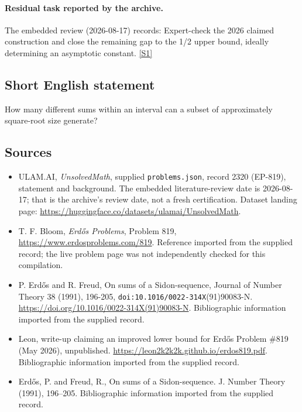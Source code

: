\documentclass[11pt,a4paper]{article}
\newcommand{\sref}[2]{\hyperlink{source:#1:#2}{[S#2]}}
\begin{document}
\paragraph{Residual task reported by the archive.}

The embedded review (2026-08-17) records: Expert-check the 2026 claimed construction and close the remaining gap to the 1/2 upper bound, ideally determining an asymptotic constant. \sref{2320}{1}

\subsection{Short English statement}

How many different sums within an interval can a subset of approximately square-root size generate?

\subsection{Sources}

{\small

\begin{itemize}

\item[\hypertarget{source:2320:1}{S1}] ULAM.AI, \emph{UnsolvedMath}, supplied \texttt{problems.json}, record 2320 (EP-819), statement and background. The embedded literature-review date is 2026-08-17; that is the archive’s review date, not a fresh certification. Dataset landing page: \url{https://huggingface.co/datasets/ulamai/UnsolvedMath}.

\item[\hypertarget{source:2320:2}{S2}] T. F. Bloom, \emph{Erdős Problems}, Problem 819, \url{https://www.erdosproblems.com/819}. Reference imported from the supplied record; the live problem page was not independently checked for this compilation.

\item[\hypertarget{source:2320:3}{S3}] P. Erdős and R. Freud, On sums of a Sidon-sequence, Journal of Number Theory 38 (1991), 196-205, \nolinkurl{doi:10.1016/0022-314X}(91)90083-N. \url{https://doi.org/10.1016/0022-314X(91)90083-N}. Bibliographic information imported from the supplied record.

\item[\hypertarget{source:2320:4}{S4}] Leon, write-up claiming an improved lower bound for Erdős Problem \#819 (May 2026), unpublished. \url{https://leon2k2k2k.github.io/erdos819.pdf}. Bibliographic information imported from the supplied record.

\item[\hypertarget{source:2320:5}{S5}] Erd\H{o}s, P. and Freud, R., On sums of a {S}idon-sequence. J. Number Theory (1991), 196--205. Bibliographic information imported from the supplied record.

\end{itemize}

}

\label{end:2320}
\end{document}
